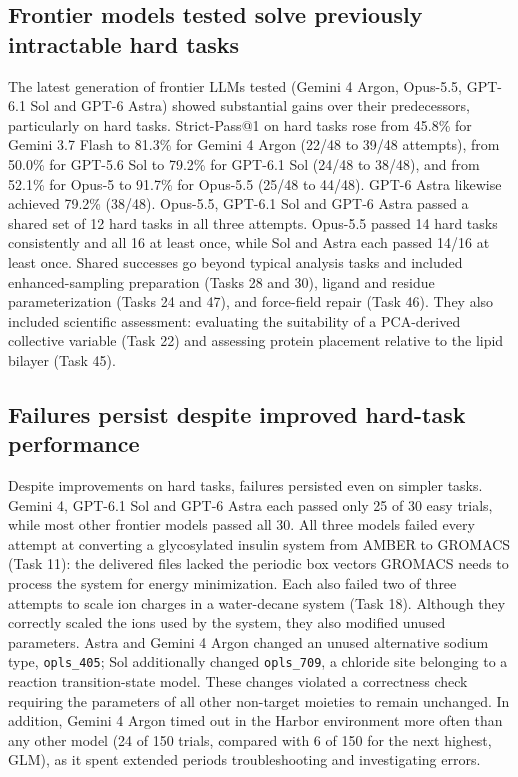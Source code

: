 \subsection[Performance on hard tasks]{Frontier models tested solve previously intractable hard tasks}

The latest generation of frontier LLMs tested (Gemini 4 Argon, Opus-5.5, GPT-6.1 Sol and GPT-6 Astra) showed substantial gains over their predecessors, particularly on hard tasks. Strict-Pass@1 on hard tasks rose from 45.8\% for Gemini 3.7 Flash to 81.3\% for Gemini 4 Argon (22/48 to 39/48 attempts), from 50.0\% for GPT-5.6 Sol to 79.2\% for GPT-6.1 Sol (24/48 to 38/48), and from 52.1\% for Opus-5 to 91.7\% for Opus-5.5 (25/48 to 44/48). GPT-6 Astra likewise achieved 79.2\% (38/48). Opus-5.5, GPT-6.1 Sol and GPT-6 Astra passed a shared set of 12 hard tasks in all three attempts. Opus-5.5 passed 14 hard tasks consistently and all 16 at least once, while Sol and Astra each passed 14/16 at least once. Shared successes go beyond typical analysis tasks and included enhanced-sampling preparation (Tasks 28 and 30), ligand and residue parameterization (Tasks 24 and 47), and force-field repair (Task 46). They also included scientific assessment: evaluating the suitability of a PCA-derived collective variable (Task 22) and assessing protein placement relative to the lipid bilayer (Task 45).


\subsection{Failures persist despite improved hard-task performance}

Despite improvements on hard tasks, failures persisted even on simpler tasks. Gemini 4, GPT-6.1 Sol and GPT-6 Astra each passed only 25 of 30 easy trials, while most other frontier models passed all 30. All three models failed every attempt at converting a glycosylated insulin system from AMBER to GROMACS (Task 11): the delivered files lacked the periodic box vectors GROMACS needs to process the system for energy minimization. Each also failed two of three attempts to scale ion charges in a water-decane system (Task 18). Although they correctly scaled the ions used by the system, they also modified unused parameters. Astra and Gemini 4 Argon changed an unused alternative sodium type, \texttt{opls\_405}; Sol additionally changed \texttt{opls\_709}, a chloride site belonging to a reaction transition-state model. These changes violated a correctness check requiring the parameters of all other non-target moieties to remain unchanged. In addition, Gemini 4 Argon timed out in the Harbor environment more often than any other model (24 of 150 trials, compared with 6 of 150 for the next highest, GLM), as it spent extended periods troubleshooting and investigating errors.

